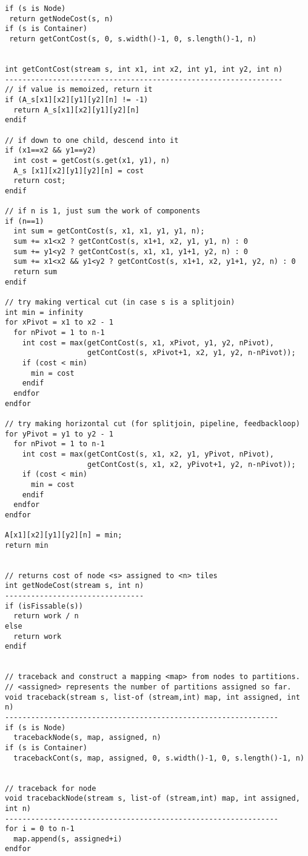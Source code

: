 \begin{verbatim}
if (s is Node)
 return getNodeCost(s, n)
if (s is Container)
 return getContCost(s, 0, s.width()-1, 0, s.length()-1, n)


int getContCost(stream s, int x1, int x2, int y1, int y2, int n)
----------------------------------------------------------------
// if value is memoized, return it
if (A_s[x1][x2][y1][y2][n] != -1)
  return A_s[x1][x2][y1][y2][n]
endif

// if down to one child, descend into it
if (x1==x2 && y1==y2)
  int cost = getCost(s.get(x1, y1), n)
  A_s [x1][x2][y1][y2][n] = cost
  return cost;
endif

// if n is 1, just sum the work of components
if (n==1)
  int sum = getContCost(s, x1, x1, y1, y1, n);
  sum += x1<x2 ? getContCost(s, x1+1, x2, y1, y1, n) : 0
  sum += y1<y2 ? getContCost(s, x1, x1, y1+1, y2, n) : 0
  sum += x1<x2 && y1<y2 ? getContCost(s, x1+1, x2, y1+1, y2, n) : 0
  return sum
endif

// try making vertical cut (in case s is a splitjoin)
int min = infinity
for xPivot = x1 to x2 - 1
  for nPivot = 1 to n-1
    int cost = max(getContCost(s, x1, xPivot, y1, y2, nPivot),
                   getContCost(s, xPivot+1, x2, y1, y2, n-nPivot));
    if (cost < min)
      min = cost
    endif
  endfor
endfor

// try making horizontal cut (for splitjoin, pipeline, feedbackloop)
for yPivot = y1 to y2 - 1
  for nPivot = 1 to n-1
    int cost = max(getContCost(s, x1, x2, y1, yPivot, nPivot),
                   getContCost(s, x1, x2, yPivot+1, y2, n-nPivot));
    if (cost < min)
      min = cost
    endif
  endfor
endfor

A[x1][x2][y1][y2][n] = min;
return min


// returns cost of node <s> assigned to <n> tiles
int getNodeCost(stream s, int n)
--------------------------------
if (isFissable(s))
  return work / n
else
  return work
endif


// traceback and construct a mapping <map> from nodes to partitions.
// <assigned> represents the number of partitions assigned so far.
void traceback(stream s, list-of (stream,int) map, int assigned, int n)
---------------------------------------------------------------
if (s is Node)
  tracebackNode(s, map, assigned, n)
if (s is Container)
  tracebackCont(s, map, assigned, 0, s.width()-1, 0, s.length()-1, n)


// traceback for node
void tracebackNode(stream s, list-of (stream,int) map, int assigned, int n)
---------------------------------------------------------------
for i = 0 to n-1
  map.append(s, assigned+i)
endfor



\end{verbatim}
